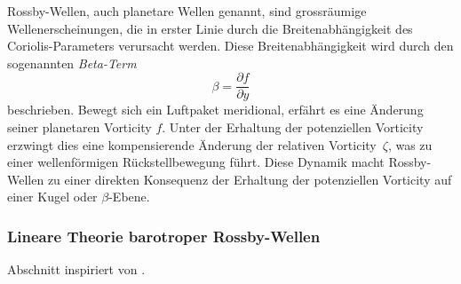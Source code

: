 
Rossby-Wellen, auch planetare Wellen genannt, sind grossräumige
Wellenerscheinungen, die in erster Linie durch die Breitenabhängigkeit des
Coriolis-Parameters verursacht werden. Diese Breitenabhängigkeit wird durch den
sogenannten \emph{Beta-Term}
\begin{equation}
	\beta = \frac{\partial f}{\partial y}
	\label{rossby:eq:beta_term}
\end{equation}
beschrieben. Bewegt sich ein Luftpaket meridional, erfährt es eine Änderung seiner planetaren Vorticity \(f\). Unter der Erhaltung der potenziellen Vorticity erzwingt dies eine kompensierende Änderung der relativen Vorticity~\(\zeta\), was zu einer wellenförmigen Rückstellbewegung führt.
Diese Dynamik macht Rossby-Wellen zu einer direkten Konsequenz der Erhaltung der potenziellen Vorticity auf einer Kugel oder \(\beta\)-Ebene.

\subsubsection{Lineare Theorie barotroper Rossby-Wellen}

Abschnitt inspiriert von \cite{rossby:mueller2018}.

